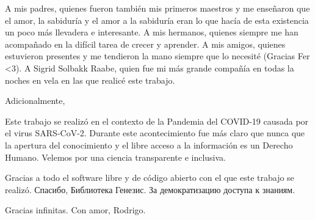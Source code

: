 \label{chapter:agradecimientos}

{\color{gray}

  
}

{
\color{gray}
\setlength{\parskip}{40pt} 
A mis padres, quienes fueron también mis primeros maestros y me enseñaron que el amor, la sabiduría y el amor a la sabiduría eran lo que hacía de esta existencia un poco más llevadera e interesante. A mis hermanos, quienes siempre me han acompañado en la difícil tarea de crecer y aprender. A mis amigos, quienes estuvieron presentes y me tendieron la mano siempre que lo necesité (Gracias Fer <3). A Sigrid Solbakk Raabe, quien fue mi más grande compañía en todas la noches en vela en las que realicé este trabajo.
}


{ 
\color{gray}
\newfontfamily{}
Adicionalmente,

Este trabajo se realizó en el contexto de la Pandemia del COVID-19 causada por el virus SARS-CoV-2. Durante este acontecimiento fue más claro que nunca que la apertura del conocimiento y el libre acceso a la información es un Derecho Humano. Velemos por una ciencia transparente e inclusiva.

Gracias a todo el software libre y de código abierto con el que este trabajo se realizó. \textrussian{Спасибо, Библиотека Генезис. За демократизацию доступа к знаниям. }
}

{
\color{gray}
\setlength{\parskip}{20pt} 
Gracias infinitas. Con amor, 
Rodrigo.
}
